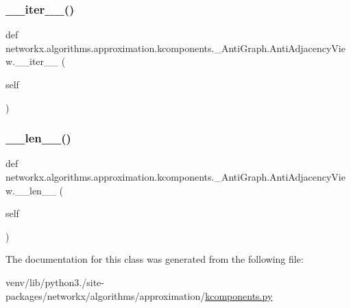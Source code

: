 \subsubsection{\texorpdfstring{\+\_\+\+\_\+iter\+\_\+\+\_\+()}{\_\_iter\_\_()}}
{\footnotesize\ttfamily def networkx.\+algorithms.\+approximation.\+kcomponents.\+\_\+\+Anti\+Graph.\+Anti\+Adjacency\+View.\+\_\+\+\_\+iter\+\_\+\+\_\+ (\begin{DoxyParamCaption}\item[{}]{self }\end{DoxyParamCaption})}

\mbox{\label{classnetworkx_1_1algorithms_1_1approximation_1_1kcomponents_1_1__AntiGraph_1_1AntiAdjacencyView_a103cfda9c3f93519ccc93a29664d7684}} 
\subsubsection{\texorpdfstring{\+\_\+\+\_\+len\+\_\+\+\_\+()}{\_\_len\_\_()}}
{\footnotesize\ttfamily def networkx.\+algorithms.\+approximation.\+kcomponents.\+\_\+\+Anti\+Graph.\+Anti\+Adjacency\+View.\+\_\+\+\_\+len\+\_\+\+\_\+ (\begin{DoxyParamCaption}\item[{}]{self }\end{DoxyParamCaption})}



The documentation for this class was generated from the following file\+:\begin{DoxyCompactItemize}
\item 
venv/lib/python3./site-\/packages/networkx/algorithms/approximation/\hyperlink{approximation_2kcomponents_8py}{kcomponents.\+py}\end{DoxyCompactItemize}
